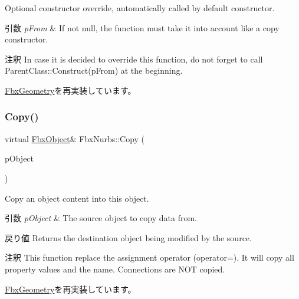 Optional constructor override, automatically called by default constructor. 
\begin{DoxyParams}{引数}
{\em p\+From} & If not null, the function must take it into account like a copy constructor. \\
\hline
\end{DoxyParams}
\begin{DoxyRemark}{注釈}
In case it is decided to override this function, do not forget to call Parent\+Class\+::\+Construct(p\+From) at the beginning. 
\end{DoxyRemark}


\hyperlink{class_fbx_geometry_a26ca96a86f17783c45ff83b33d2b5324}{Fbx\+Geometry}を再実装しています。

\mbox{\label{class_fbx_nurbs_ac7c9a9018b4fdbe72b258a2fa0a3367d}} 
\subsubsection{\texorpdfstring{Copy()}{Copy()}}
{\footnotesize\ttfamily virtual \hyperlink{class_fbx_object}{Fbx\+Object}\& Fbx\+Nurbs\+::\+Copy (\begin{DoxyParamCaption}\item[{const \hyperlink{class_fbx_object}{Fbx\+Object} \&}]{p\+Object }\end{DoxyParamCaption})\hspace{0.3cm}{\ttfamily [virtual]}}

Copy an object content into this object. 
\begin{DoxyParams}{引数}
{\em p\+Object} & The source object to copy data from. \\
\hline
\end{DoxyParams}
\begin{DoxyReturn}{戻り値}
Returns the destination object being modified by the source. 
\end{DoxyReturn}
\begin{DoxyRemark}{注釈}
This function replace the assignment operator (operator=). It will copy all property values and the name. Connections are N\+OT copied. 
\end{DoxyRemark}


\hyperlink{class_fbx_geometry_aac1cee4251e3d5fbd27f1181c58b83b3}{Fbx\+Geometry}を再実装しています。

\mbox{\label{class_fbx_nurbs_a8a5ea388bc948e47ab65e1705f98f402}} 

